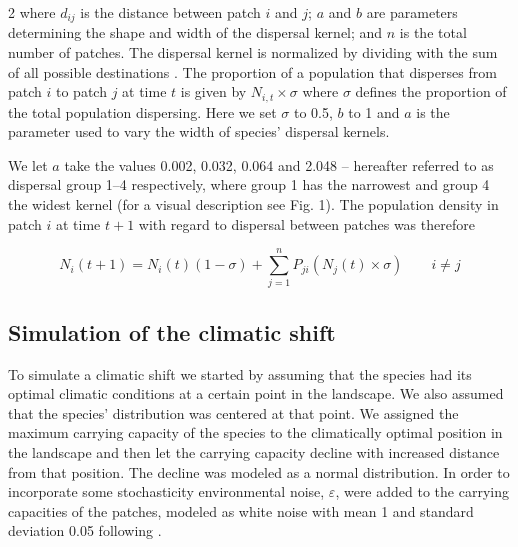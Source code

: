 \documentclass[12pt,pdftex]{article}
\begin{document}
\begin{spacing}{2}
where $d_{ij}$ is the distance between patch $i$ and $j$; $a$ and $b$ are parameters determining the shape and width of the dispersal kernel; and $n$ is the total number of patches. The dispersal kernel is normalized by dividing with the sum of all possible destinations \citep{Lindstrom2009}. The proportion of a population that disperses from patch $i$ to patch $j$ at time $t$ is given by $N_{i,t} \times \sigma$ where $\sigma$ defines the proportion of the total population dispersing. Here we set $\sigma$ to 0.5, $b$ to 1 and $a$ is the parameter used to vary the width of species' dispersal kernels. 

 We let $a$ take the values 0.002, 0.032, 0.064 and 2.048 -- hereafter referred to as dispersal group 1--4 respectively, where group 1 has the narrowest and group 4 the widest kernel (for a visual description see Fig. 1).  The population density in patch $i$ at time $t+1$ with regard to dispersal between patches was therefore 

\begin{equation}
	N_{i}(t+1)=N_{i}(t)  (1- \sigma)  + \sum_{j=1}^{n}P_{ji}(N_{j}(t) \times \sigma) \qquad i\neq j
\end{equation}


\subsection*{Simulation of the climatic shift} 
To simulate a climatic shift we started by assuming that the species had its optimal climatic conditions at a certain point in the landscape. We also assumed that the species’ distribution was centered at that point. We assigned the maximum carrying capacity of the species to the climatically optimal position in the landscape and then let the carrying capacity decline with increased distance from that position. The decline was modeled as a normal distribution. In order to incorporate some stochasticity environmental noise, $\varepsilon$, were added to the carrying capacities of the patches, modeled as white noise with mean 1 and standard deviation 0.05 following \cite{Logdberg2012}. 


\end{spacing}
\end{document}
